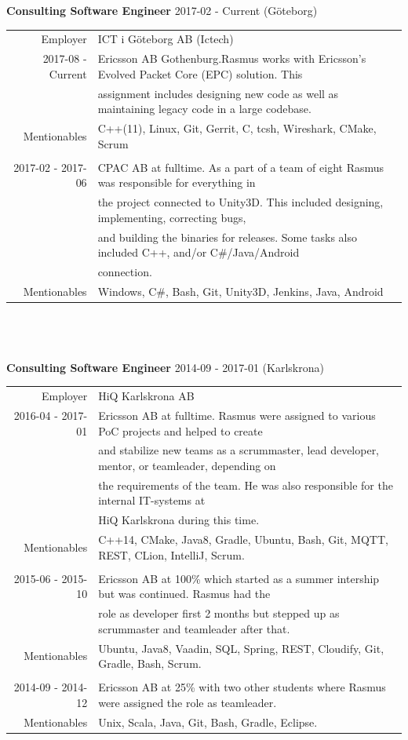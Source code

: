 \documentclass[a4paper, 11pt]{article}
\begin{document}
\textbf{Consulting Software Engineer} 2017-02 - Current (Göteborg) \\
\begin{tabular}{rl}
Employer& ICT i Göteborg AB (Ictech)\\
2017-08 - Current& Ericsson AB Gothenburg.Rasmus works with Ericsson's Evolved Packet Core (EPC) solution. This\\& assignment includes designing new code as well as maintaining legacy code in a large codebase. \\
Mentionables& C++(11), Linux,  Git, Gerrit, C, tcsh, Wireshark, CMake, Scrum   \\\\

2017-02 - 2017-06& CPAC AB at fulltime. As a part of a team of eight Rasmus was responsible for everything in\\& the project connected to Unity3D.  This included designing, implementing, correcting bugs,\\& and building the binaries for releases. Some tasks also included C++, and/or C\#/Java/Android\\& connection.\\
Mentionables& Windows, C\#, Bash, Git, Unity3D, Jenkins, Java, Android
\end{tabular}
\\\\\\
\textbf{Consulting Software Engineer} 2014-09 - 2017-01 (Karlskrona) \\
\begin{tabular}{rl}
Employer& HiQ Karlskrona AB\\
2016-04 - 2017-01& Ericsson AB at fulltime. Rasmus were assigned to various PoC projects and helped to create\\& and stabilize new teams as a scrummaster, lead developer, mentor, or teamleader, depending on\\& the requirements of the team. He was also responsible for the internal IT-systems at\\& HiQ Karlskrona during this time.\\
Mentionables& C++14, CMake, Java8, Gradle, Ubuntu, Bash, Git, MQTT, REST, CLion, IntelliJ, Scrum.\\\\

2015-06 - 2015-10&Ericsson AB at 100\% which started as a summer intership but was continued. Rasmus had the\\& role as developer first 2 months but stepped up as scrummaster and teamleader after that. \\
Mentionables& Ubuntu, Java8, Vaadin, SQL, Spring, REST, Cloudify, Git, Gradle, Bash, Scrum.\\\\

2014-09 - 2014-12& Ericsson AB at 25\% with two other students where Rasmus were assigned the role as teamleader.\\
Mentionables& Unix, Scala, Java, Git, Bash, Gradle, Eclipse.
\end{tabular}
\end{document}

